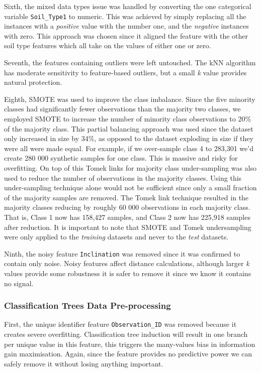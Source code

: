 \documentclass[10pt, conference]{IEEEtran}
\begin{document}
 Sixth, the mixed data types issue was handled by converting the one categorical variable \texttt{Soil\_Type1} to numeric. This was achieved by simply replacing all the instances with a \textit{positive} value with the number one, and the \textit{negative} instances with zero. This approach was chosen since it aligned the feature with the other soil type features which all take on the values of either one or zero.
 
 Seventh, the features containing outliers were left untouched. The kNN algorithm has moderate sensitivity to feature-based outliers, but a small \textit{k} value provides natural protection.
 
 Eighth, SMOTE was used to improve the class imbalance. Since the five minority classes had significantly fewer observations than the majority two classes, we employed SMOTE to increase the number of minority class observations to 20\% of the majority class. This partial balancing approach was used since the dataset only increased in size by 34\%, as opposed to the dataset exploding in size if they were all were made equal. For example, if we over-sample class 4 to 283,301 we'd create 280 000 synthetic samples for one class. This is massive and risky for overfitting. On top of this Tomek links for majority class under-sampling was also used to reduce the number of observations in the majority classes. Using this under-sampling technique alone would not be sufficient since only a small fraction of the majority samples are removed. The Tomek link technique resulted in the majority classes reducing by roughly 60 000 observations in each majority class. That is, Class 1 now has 158,427 samples, and Class 2 now has 225,918 samples after reduction.  It is important to note that SMOTE  and Tomek undersampling were only applied to the \textit{training} datasets and never to the \textit{test} datasets.
 
 Ninth, the noisy feature \texttt{Inclination} was removed since it was confirmed to contain only noise. Noisy features affect distance calculations, although larger \textit{k} values provide some robustness it is safer to remove it since we know it contains no signal.

\subsubsection{Classification Trees Data Pre-processing}

First, the unique identifier feature \texttt{Observation\_ID} was removed because it creates severe overfitting. Classification tree induction will result in one branch per unique value in this feature, this triggers the many-values bias in information gain maximisation. Again, since the feature provides no predictive power we can safely remove it without losing anything important.
\end{document}
